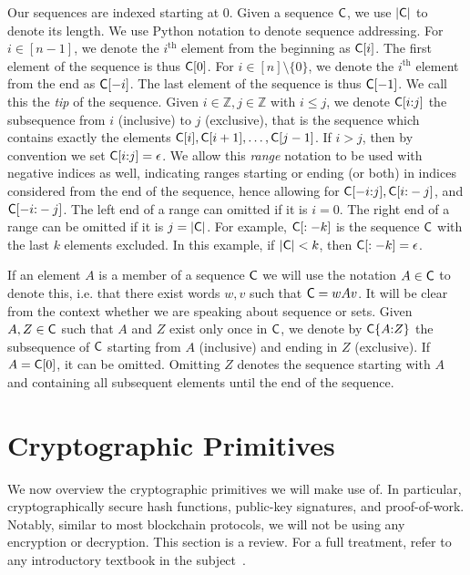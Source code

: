Our sequences are indexed starting at $0$. Given a sequence $\mathsf{C}$, we use
$|\mathsf{C}|$ to denote its length. We use Python notation to denote sequence
addressing. For $i \in [n - 1]$, we denote the $i^\text{th}$ element from the
beginning as $\mathsf{C}[i]$. The first element of the sequence is thus $\mathsf{C}[0]$.
For $i \in [n] \setminus \{0\}$, we denote the $i^\text{th}$ element from the
end as $\mathsf{C}[-i]$. The last element of the sequence is thus $\mathsf{C}[-1]$. We
call this the \emph{tip} of the sequence. Given $i \in \mathbb{Z},
j \in \mathbb{Z}$ with $i \leq j$, we denote $\mathsf{C}[i{:}j]$ the subsequence from
$i$ (inclusive) to $j$ (exclusive), that is the sequence which contains exactly
the elements $\mathsf{C}[i], \mathsf{C}[i + 1], \dots, \mathsf{C}[j - 1]$. If $i > j$, then
by convention we set $\mathsf{C}[i{:}j] = \epsilon$. We allow this \emph{range}
notation to be used with negative indices as well, indicating ranges starting or
ending (or both) in indices considered from the end of the sequence, hence
allowing for $\mathsf{C}[-i{:}j], \mathsf{C}[i{:}-j]$, and $\mathsf{C}[-i{:}-j]$. The left end of
a range can omitted if it is $i = 0$. The right end of a range can be omitted if
it is $j = |\mathsf{C}|$. For example, $\mathsf{C}[:-k]$ is the sequence $\mathsf{C}$ with
the last $k$ elements excluded. In this example, if $|\mathsf{C}| < k$, then
$\mathsf{C}[:-k] = \epsilon$.

If an element $A$ is a member of a sequence $\mathsf{C}$ we will use the notation $A
\in \mathsf{C}$ to denote this, i.e. that there exist words $w, v$ such that $\mathsf{C}
= wAv$. It will be clear from the context whether we are speaking about sequence
or sets. Given $A, Z \in \mathsf{C}$ such that $A$ and $Z$ exist only once in
$\mathsf{C}$, we denote by $\mathsf{C}\{A{:}Z\}$ the subsequence of $\mathsf{C}$ starting from
$A$ (inclusive) and ending in $Z$ (exclusive). If $A = \mathsf{C}[0]$, it can be
omitted. Omitting $Z$ denotes the sequence starting with $A$ and containing all
subsequent elements until the end of the sequence.

\section{Cryptographic Primitives}

We now overview the cryptographic primitives we will make use of. In particular,
cryptographically secure hash functions, public-key signatures, and
proof-of-work. Notably, similar to most blockchain protocols, we will not be
using any encryption or decryption. This section is a review. For a full
treatment, refer to any introductory textbook in the subject~\cite{katz,handbook,foundations1,foundations2}.

